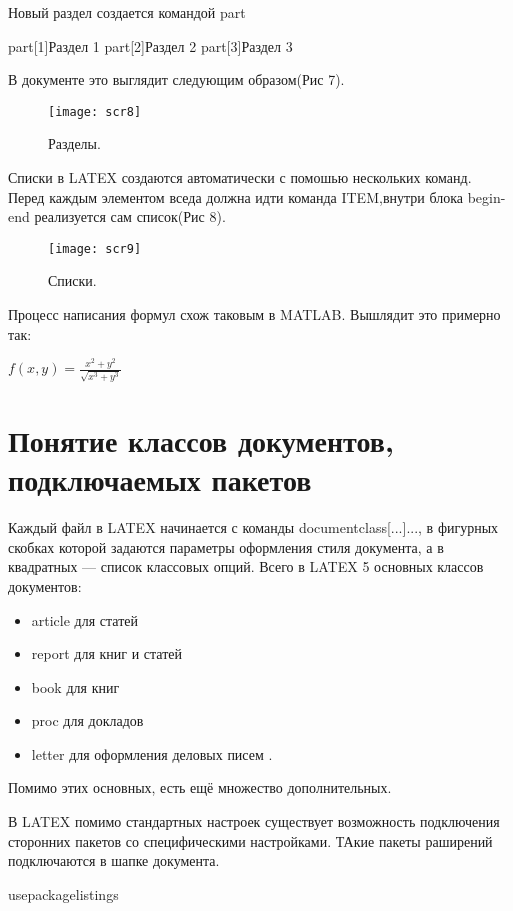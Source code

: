\documentclass[a4paper,12pt]{article}
\begin{document}
Новый раздел создается командой part
\begin{verbatim*}
	part[1]{Раздел 1}
	part[2]{Раздел 2}
	part[3]{Раздел 3}
\end{verbatim*}
В документе это выглядит следующим образом(Рис 7).
\begin{figure}
	\center
	\texttt{[image: scr8]}
	\caption{Разделы.}
\end{figure}
Списки в LATEX создаются автоматически с помошью нескольких команд. Перед каждым элементом вседа должна идти команда ITEM,внутри блока begin-end реализуется сам список(Рис 8).
\begin{figure}
	\center
	\texttt{[image: scr9]}
	\caption{Списки.}
\end{figure}
Процесс написания формул схож  таковым в MATLAB. Вышлядит это примерно так:
\begin{verbatim*}
	f\{x,y}\=\frac{x^2+y^2}{\sqrt{x^3+y^3}}
\end{verbatim*}
\begin{math}
	f(x,y) = \frac{x^2+y^2}{\sqrt{x^3+y^3}}
\end{math}

\section[5]{Понятие классов документов, подключаемых пакетов}

Каждый файл в LATEX начинается с команды documentclass[...]{...}, в фигурных скобках которой задаются параметры оформления стиля документа, а в квадратных — список классовых опций.
Всего в LATEX 5 основных классов документов:
\begin{itemize}
\item {article для статей}
\item {report для книг и статей}
\item {book для книг}
\item {proc для докладов}
\item {letter для оформления деловых писем} . 
\end{itemize} 
Помимо этих основных, есть ещё множество дополнительных.


В LATEX помимо стандартных настроек существует возможность подключения сторонних пакетов со специфическими настройками. ТАкие пакеты раширений подключаются в шапке документа.
\begin{verbatim*}
	usepackage{listings} % предоставляет возможности цитирования кода в тексте с сохранением исходного форматирования.
\end{verbatim*}
\end{document}

